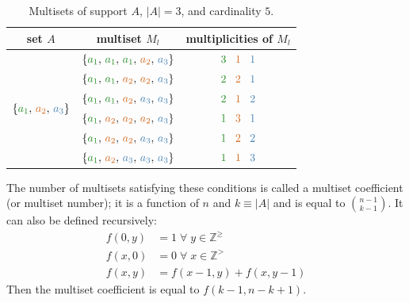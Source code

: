 \documentclass[12pt]{article}
\begin{document}
\begin{table}
  \centering
  \begin{tabular}{| c | c | c |}
    \hline
    \rowcolor{bg} set $A$ & multiset $M_l$ & multiplicities of $M_l$          \\
    \hline
    \multirow{6}{*}{$\{{\color{c1}a_1}, \, {\color{c2}a_2}, \, 
                       {\color{c3}a_3}\}$} 
    & $\{{\color{c1}a_1}, \, {\color{c1}a_1}, \, {\color{c1}a_1}, \, 
         {\color{c2}a_2}, \, {\color{c3}a_3}\}$ 
    & ${\color{c1}3} \;\;\; {\color{c2}1} \;\;\; {\color{c3}1}$               \\
    & $\{{\color{c1}a_1}, \, {\color{c1}a_1}, \, {\color{c2}a_2}, \,
         {\color{c2}a_2}, \, {\color{c3}a_3}\}$ 
    & ${\color{c1}2} \;\;\; {\color{c2}2} \;\;\; {\color{c3}1}$               \\         & $\{{\color{c1}a_1}, \, {\color{c1}a_1}, \, {\color{c2}a_2}, \, 
         {\color{c3}a_3}, \, {\color{c3}a_3}\}$ 
    & ${\color{c1}2} \;\;\; {\color{c2}1} \;\;\; {\color{c3}2}$               \\         & $\{{\color{c1}a_1}, \, {\color{c2}a_2}, \, {\color{c2}a_2}, \, 
         {\color{c2}a_2}, \, {\color{c3}a_3}\}$ 
    & ${\color{c1}1} \;\;\; {\color{c2}3} \;\;\; {\color{c3}1}$               \\
    & $\{{\color{c1}a_1}, \, {\color{c2}a_2}, \, {\color{c2}a_2}, \, 
         {\color{c3}a_3}, \, {\color{c3}a_3}\}$ 
    & ${\color{c1}1} \;\;\; {\color{c2}2} \;\;\; {\color{c3}2}$               \\
    & $\{{\color{c1}a_1}, \, {\color{c2}a_2}, \, {\color{c3}a_3}, \, 
         {\color{c3}a_3}, \, {\color{c3}a_3}\}$ 
    & ${\color{c1}1} \;\;\; {\color{c2}1} \;\;\; {\color{c3}3}$               \\    
    \hline
  \end{tabular}
  \caption{Multisets of support $A$, $|A| = 3$, and cardinality $5$.}
  \label{tab:ex1}
\end{table}  

The number of multisets satisfying these conditions is called a multiset coefficient (or multiset number); it is a function of $n$ and $k \equiv |A|$ and is equal to $\binom{n - 1}{k - 1}$. It can also be defined recursively:
\begin{align*}
  f(0, y) &= 1 \; \forall \; y \in \mathbb{Z}^{\geqslant} \\
  f(x, 0) &= 0 \; \forall \; x \in \mathbb{Z}^{>} \\
  f(x, y) &= f(x - 1, y) + f(x, y - 1)
\end{align*}
Then the multiset coefficient is equal to $f(k - 1, n - k + 1)$. 
\end{document}
